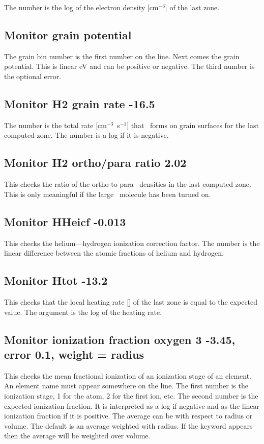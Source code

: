 The number is the log of the electron density [cm$^{-3}$] of the last zone.

\subsection{Monitor grain potential}

The grain bin number is the first number on the line.  Next comes the
grain potential.
This is linear eV and can be positive or negative.
The third number is the optional error.

\subsection{Monitor H2 grain rate -16.5}

The number is the total rate [cm$^{-3}$~s$^{-1}$] that \htwo\ forms on grain surfaces
for the last computed zone.
The number is a log if it is negative.

\subsection{Monitor H2 ortho/para ratio 2.02}

This checks the ratio of the ortho to para \htwo\ densities in the last
computed zone.
This is only meaningful if the large \htwo\ molecule has been
turned on.

\subsection{Monitor HHeicf -0.013}

This checks the helium---hydrogen ionization correction factor.
The number is the linear difference between the atomic fractions
of helium and hydrogen.

\subsection{Monitor Htot -13.2}

This checks that the local heating rate [\ergpccmps ]
of the last zone is equal to the expected value.
The argument is the log of the heating rate.

\subsection{Monitor ionization fraction oxygen 3 -3.45, error 0.1, weight =
radius}

This checks the mean fractional ionization of an ionization stage of
an element.
An element name must appear somewhere on the line.
The first
number is the ionization stage, 1 for the atom, 2 for the first ion, etc.
The second number is the expected ionization fraction.
It is interpreted
as a log if negative and as the linear ionization fraction if it is positive.
The average can be with respect to radius or volume.
The default is an
average weighted with radius.
If the keyword  appears then the average
will be weighted over volume.

